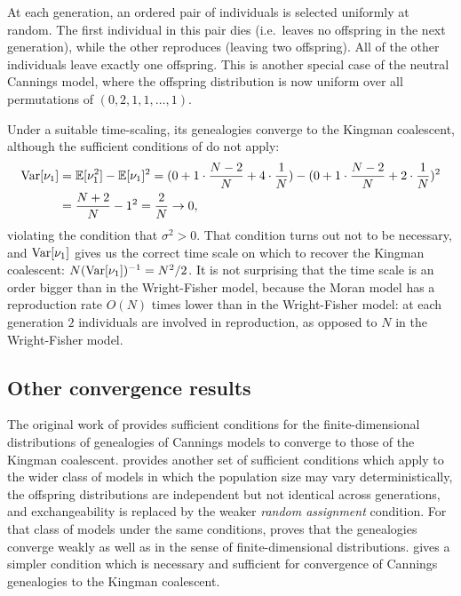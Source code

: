 At each generation, an ordered pair of individuals is selected uniformly at random. The first individual in this pair dies (i.e.\ leaves no offspring in the next generation), while the other reproduces (leaving two offspring). All of the other individuals leave exactly one offspring.
This is another special case of the neutral Cannings model, where the offspring distribution is now uniform over all permutations of $(0,2,1,1,\dots,1)$.

Under a suitable time-scaling, its genealogies converge to the Kingman coalescent,
although the sufficient conditions of \textcite{kingman1982gene} do not apply:
\begin{align*}
\operatorname{Var}[\nu_1] 
&= \mathbb{E}[\nu_1^2] - \mathbb{E}[\nu_1]^2
= (0 + 1 \cdot \frac{N-2}{N} + 4 \cdot \frac{1}{N}) - (0 + 1 \cdot \frac{N-2}{N} + 2 \cdot \frac{1}{N})^2 \\
&= \frac{N+2}{N} - 1^2
= \frac{2}{N}
\to 0 ,
\end{align*}
violating the condition that $\sigma^2 >0$. 
That condition turns out not to be necessary, and $\operatorname{Var}[\nu_1]$ gives us the correct time scale on which to recover the Kingman coalescent: $N(\operatorname{Var}[\nu_1])^{-1} = N^2/2$.
It is not surprising that the time scale is an order bigger than in the Wright-Fisher model, because the Moran model has a reproduction rate $O(N)$ times lower than in the Wright-Fisher model: at each generation $2$ individuals are involved in reproduction, as opposed to $N$ in the Wright-Fisher model.




\subsection{Other convergence results}
\label{sec:previousgeneconv}
The original work of \textcite{kingman1982gene} provides sufficient conditions for the finite-dim\-ension\-al distributions of genealogies of Cannings models to converge to those of the Kingman coalescent.
\textcite{mohle1998} provides another set of sufficient conditions which apply to the wider class of models in which the population size may vary deterministically, the offspring distributions are independent but not identical across generations, and exchangeability is replaced by the weaker \emph{random assignment} condition. 
For that class of models under the same conditions, \textcite{mohle1999} proves that the genealogies converge weakly as well as in the sense of finite-dimensional distributions.
\textcite{mohle2000} gives a simpler condition which is necessary and sufficient for convergence of Cannings genealogies to the Kingman coalescent. %

